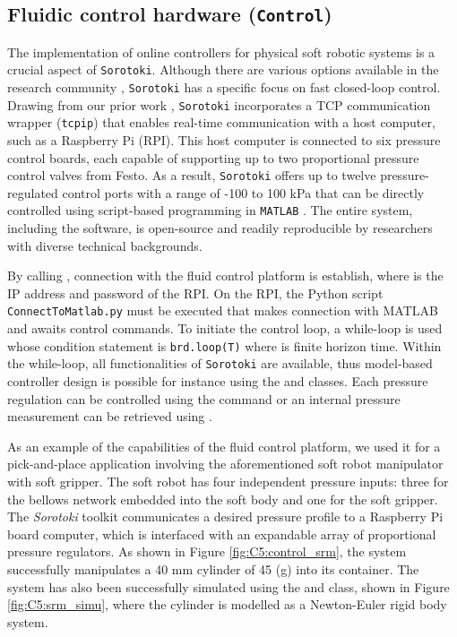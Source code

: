
\subsection{Fluidic control hardware (\texttt{Control})}
\label{sec:C5:control}
The implementation of online controllers for physical soft robotic systems is a crucial aspect of \texttt{Sorotoki}. Although there are various options available in the research community \cite{Xavier2022Jun}, \texttt{Sorotoki} has a specific focus on fast closed-loop control. Drawing from our prior work \cite{Caasenbrood2022Apr}, \texttt{Sorotoki} incorporates a TCP communication wrapper (\texttt{tcpip}) that enables real-time communication with a host computer, such as a Raspberry Pi (RPI). This host computer is connected to six pressure control boards, each capable of supporting up to two proportional pressure control valves from Festo. As a result, \texttt{Sorotoki} offers up to twelve pressure-regulated control ports with a range of -100 to 100 kPa that can be directly controlled using script-based programming in \texttt{MATLAB} . The entire system, including the software, is open-source and readily reproducible by researchers with diverse technical backgrounds.

By calling , connection with the fluid control platform is establish, where  is the IP address and password of the RPI. On the RPI, the Python script \texttt{ConnectToMatlab.py} must be executed that makes connection with {MATLAB} and awaits control commands. To initiate the control loop, a while-loop is used whose condition statement is \texttt{brd.loop(T)} where  is finite horizon time. Within the while-loop, all functionalities of \texttt{Sorotoki} are available, thus model-based controller design is possible for instance using the  and  classes. Each pressure regulation can be controlled using the command  or an internal pressure measurement can be retrieved using . \\ \vspace{-5mm}

\begin{example}
As an example of the capabilities of the fluid control platform, we used it for a pick-and-place application involving the aforementioned soft robot manipulator with soft gripper. The soft robot has four independent pressure inputs: three for the bellows network embedded into the soft body and one for the soft gripper. The \textit{Sorotoki} toolkit communicates a desired pressure profile to a Raspberry Pi board computer, which is interfaced with an expandable array of proportional pressure regulators. As shown in Figure \ref{fig:C5:control_srm}, the system successfully manipulates a 40 mm cylinder of 45 (g) into its container. The system has also been successfully simulated using the  and  class, shown in Figure \ref{fig:C5:srm_simu}, where the cylinder is modelled as a Newton-Euler rigid body system.
\end{example}

